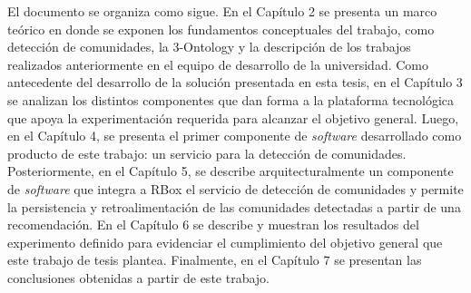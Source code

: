 El documento se organiza como sigue. En el Capítulo 2 se presenta un marco teórico en donde se exponen los fundamentos conceptuales del trabajo, como detección de comunidades, la 3-Ontology y la descripción de los trabajos realizados anteriormente en el equipo de desarrollo de la universidad. Como antecedente del desarrollo de la solución presentada en esta tesis, en el Capítulo 3 se analizan los distintos componentes que dan forma a la plataforma tecnológica que apoya la experimentación requerida para alcanzar el objetivo general. Luego, en el Capítulo 4, se presenta el primer componente de \textit{software} desarrollado como producto de este trabajo: un servicio para la detección de comunidades. Posteriormente, en el Capítulo 5, se describe arquitecturalmente un componente de \textit{software} que integra a RBox el servicio de detección de comunidades y permite la persistencia y retroalimentación de las comunidades detectadas a partir de una recomendación. En el Capítulo 6 se describe y muestran los resultados del experimento definido para evidenciar el cumplimiento del objetivo general que este trabajo de tesis plantea. Finalmente, en el Capítulo 7 se presentan las conclusiones obtenidas a partir de este trabajo.
